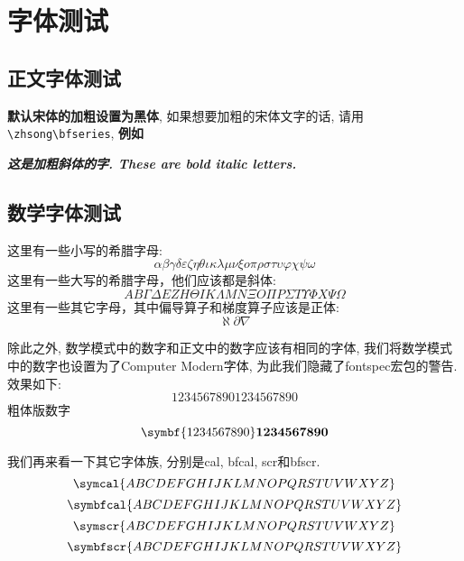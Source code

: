 
\section{字体测试}

\zhlipsum[1]

\subsection{正文字体测试}

{\bfseries 默认宋体的加粗设置为黑体}, 如果想要加粗的宋体文字的话, 请用\verb|\zhsong\bfseries|, {\zhsong\bfseries 例如\zhlipsum[1]}

{\bfseries\itshape 这是加粗斜体的字. These are bold italic letters. \zhlipsum[1]\lipsum[1]}

\subsection{数学字体测试}

这里有一些小写的希腊字母:
\begin{equation}
  \alpha \beta \gamma \delta \varepsilon \zeta \eta \theta \iota \kappa \lambda \mu \nu \xi o \pi \rho \sigma \tau \upsilon \varphi \chi \psi \omega
\end{equation}
这里有一些大写的希腊字母，他们应该都是斜体:
\begin{equation}
  A B \Gamma \Delta E Z H \Theta I K \Lambda M N \Xi O \Pi P \Sigma T \Upsilon \varPhi X \Psi \Omega
\end{equation}
这里有一些其它字母，其中偏导算子和梯度算子应该是正体:
\begin{equation}
  \aleph \partial \nabla
\end{equation}

除此之外, 数学模式中的数字和正文中的数字应该有相同的字体, 我们将数学模式中的数字也设置为了Computer Modern字体, 为此我们隐藏了fontspec宏包的警告. 效果如下:
\begin{equation}
  1234567890\text{1234567890}
\end{equation}
粗体版数字
\begin{equation}
  \symbf{1234567890}\text{\textbf{1234567890}}
\end{equation}

我们再来看一下其它字体族, 分别是cal, bfcal, scr和bfscr.
\begin{equation}
  \symcal{ABCDEFGHIJKLMNOPQRSTUVWXYZ}
\end{equation}
\begin{equation}
  \symbfcal{ABCDEFGHIJKLMNOPQRSTUVWXYZ}
\end{equation}
\begin{equation}
  \symscr{ABCDEFGHIJKLMNOPQRSTUVWXYZ}
\end{equation}
\begin{equation}
  \symbfscr{ABCDEFGHIJKLMNOPQRSTUVWXYZ}
\end{equation}

